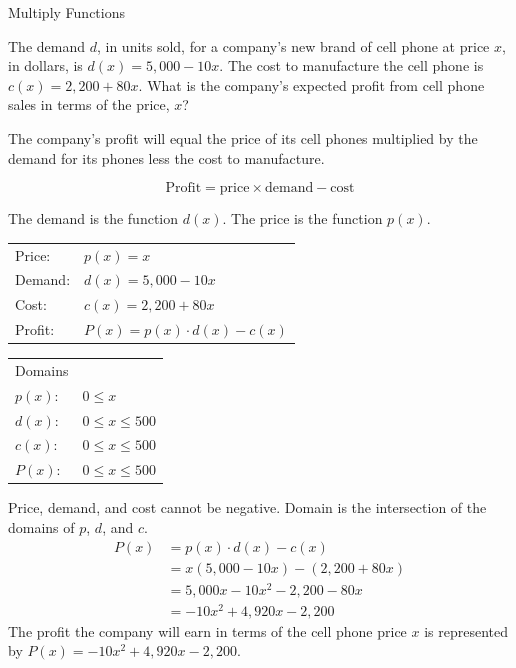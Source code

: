 \documentclass{article}
\newenvironment{example}[1]{}{}         %
\newcommand{\answer}[1]{}               %
\newcommand{\placeholder}[2]{}          %
\begin{document}
\begin{example}{2}
Multiply Functions

The demand \(d\), in units sold, for a company's new brand of cell phone at price \(x\), in dollars, is \(d(x)=5{,}000-10x\). The cost to manufacture the cell phone is \(c(x)=2{,}200+80x\). What is the company's expected profit from cell phone sales in terms of the price, \(x\)?

\placeholder{illustration}{Equation model with icons: Profit equals Price times Demand minus Cost. The icons are labeled Profit, Price, Demand, and Cost.}

The company's profit will equal the price of its cell phones multiplied by the demand for its phones less the cost to manufacture.

\[
\text{Profit}=\text{price}\times\text{demand}-\text{cost}
\]

The demand is the function \(d(x)\). The price is the function \(p(x)\).

\begin{tabular}{ll}
Price: & \(p(x)=x\) \\
Demand: & \(d(x)=5{,}000-10x\) \\
Cost: & \(c(x)=2{,}200+80x\) \\
Profit: & \(P(x)=p(x)\cdot d(x)-c(x)\) \\
\end{tabular}
\qquad
\begin{tabular}{ll}
Domains & \\
\(p(x):\) & \(0\le x\) \\
\(d(x):\) & \(0\le x\le 500\) \\
\(c(x):\) & \(0\le x\le 500\) \\
\(P(x):\) & \(0\le x\le 500\) \\
\end{tabular}

Price, demand, and cost cannot be negative. Domain is the intersection of the domains of \(p\), \(d\), and \(c\).
\[
\begin{aligned}
P(x)&=p(x)\cdot d(x)-c(x)\\
&=x(5{,}000-10x)-(2{,}200+80x)\\
&=5{,}000x-10x^2-2{,}200-80x\\
&=-10x^2+4{,}920x-2{,}200
\end{aligned}
\]
The profit the company will earn in terms of the cell phone price \(x\) is represented by \(P(x)=-10x^2+4{,}920x-2{,}200\).

\answer{\(P(x)=-10x^2+4{,}920x-2{,}200\), with domain \(0\le x\le 500\).}
\end{example}
\end{document}
